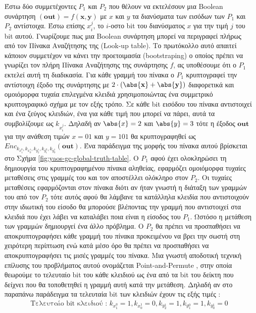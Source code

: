 Έστω δύο συμμετέχοντες $P_1$ και $P_2$ που θέλουν να εκτελέσουν μια Boolean συνάρτηση $(\mathbf{out}) = f(\mathbf{x}, \mathbf{y})$ με $x$ και $y$ τα διανύσματα των εισόδων των $P_1$ και $P_2$ αντίστοιχα. Έστω επίσης $x_i^j$, το $i$-οστο bit του διανύσματος $x$ για την τιμή $j$ του bit αυτού.  Γνωρίζουμε πως μια Boolean συνάρτηση μπορεί να περιγραφεί πλήρως από τον Πίνακα Αναζήτησης της (Look-up table). Το πρωτόκολλο αυτό απαιτεί κάποιον συμμετέχον να κάνει την προετοιμασία (bootstraping) ο οποίος πρέπει να γνωρίζει τον πλήρη Πίνακα Αναζήτησης της συνάρτησης $f$, ας υποθέσουμε ότι ο $P_1$ εκτελεί αυτή τη διαδικασία. Για κάθε γραμμή του πίνακα ο $P_1$ κρυπτογραφεί την αντίστοιχη έξοδο της συνάρτησης με $2 \cdot (\abs{\mathbf{x}} + \abs{\mathbf{y}})$ διαφορετικά και ομοιόμορφα τυχαία επιλεγμένα κλειδιά χρησιμοποιώντας ένα συμμετρικό κρυπτογραφικό σχήμα με τον εξής τρόπο. Σε κάθε bit εισόδου του πίνακα αντιστοιχεί και ένα ζεύγος κλειδιών, ένα για κάθε τιμή που μπορεί να πάρει, αυτά τα συμβολίζουμε ως $k_{x_i^j}$. Δηλαδή αν $\abs{x}=2$ και $\abs{y}=3$ τότε η έξοδος $\mathbf{out}$ για την ανάθεση τιμών $x=01$ και $y=101$ θα κρυπτογραφηθεί ως $Enc_{k_{x_1^0}, k_{x_0^1}, k_{y_2^1}, k_{y_1^0}, k_{y_0^1}}(\mathbf{out})$. Ένα παράδειγμα της μορφής του πίνακα αυτού βρίσκεται στο Σχήμα \ref{fig:yaos-gc-global-truth-table}. Ο $P_1$ αφού έχει ολοκληρώσει τη δημιουργία του κρυπτογραφημένου πίνακα αληθείας, εφαρμόζει ομοιόμορφα τυχαίες μεταθέσεις στις γραμμές του και τον αποστέλλει ολόκληρο στον $P_2$. Οι τυχαίες μεταθέσεις εφαρμόζονται στον πίνακα διότι αν ήταν γνωστή η διάταξη των γραμμών του από τον $P_2$ τότε αυτός αφού θα λάμβανε τα κατάλληλα κλειδία που αντιστοιχούν στην ιδιωτική του είσοδο θα μπορούσε βλέποντας την γραμμή που αντιστοιχεί στα κλειδιά που έχει λάβει να καταλάβει ποια είναι η είσοδος του $P_1$. Ωστόσο η μετάθεση των γραμμών δημιουργεί ένα άλλο πρόβλημα. Ο $P_2$ θα πρέπει να προσπαθήσει να αποκρυπτογραφήσει κάθε γραμμή του πίνακα προκειμένου να βρει την σωστή στη χειρότερη περίπτωση ενώ κατά μέσο όρο θα πρέπει να προσπαθήσει να αποκρυπτογραφήσει τις μισές γραμμές του πίνακα. Μια γνωστή αποδοτική τεχνική επίλυσης του προβλήματος αυτού ονομάζεται Point-and-Permute , στην οποία θεωρούμε το τελευταίο bit του κάθε κλειδιού ως ένα από τα bit του δείκτη που δείχνει που θα τοποθετηθεί η γραμμή αυτή κατά την μετάθεση. Δηλαδή αν στο παραπάνω παράδειγμα τα τελευταία bit των κλειδιών έχουν τις εξής τιμές :
%
\begin{align*}
    \text{Τελευταίο bit κλειδιού : }k_{x_1^0} = 1, k_{x_0^1} = 0, k_{y_2^1} = 1, k_{y_1^0} = 1, k_{y_0^1} = 0
\end{align*}
